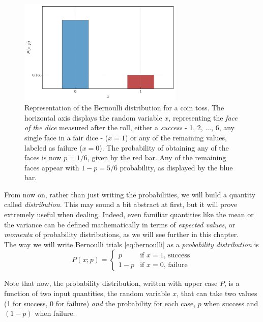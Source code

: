 \documentclass{book}
\begin{document}
\begin{figure}[ht]
    \centering
    \includegraphics[width=0.7\textwidth]{figures/chapter2/bernoulli_2.png}
    \caption{Representation of the Bernoulli distribution for a coin toss. The horizontal axis displays the random variable $x$, representing the \textit{face of the dice} measured after the roll, either a \textit{success} - 1, 2, ..., 6, any single face in a fair dice - ($x = 1$) or any of the remaining values, labeled as failure ($x = 0$). The probability of obtaining any of the faces is now $p = 1/6$, given by the red bar. Any of the remaining faces appear with $1 - p = 5/6$ probability, as displayed by the blue bar.}
    \label{fig:bernoulli_2}
\end{figure}

From now on, rather than just writing the probabilities, we will build a quantity called \textit{distribution}. This may sound a bit abstract at first, but it will prove extremely useful when dealing. Indeed, even familiar quantities like the mean or the variance can be defined mathematically in terms of \textit{expected values}, or \textit{momenta} of probability distributions, as we will see further in this chapter.\\

The way we will write Bernoulli trials \eqref{eq:bernoulli} as a \textit{probability distribution} is 
\begin{equation}
	P(x; p) = 
		\begin{cases}
			p & \text{if $x = 1$, success} \\
			1 - p & \text{if $x = 0$, failure}
		\end{cases}
\end{equation}

Note that now, the probability distribution, written with upper case $P$, is a function of two input quantities, the random variable $x$, that can take two values (1 for success, 0 for failure) \textit{and} the probability for each case, $p$ when success and $(1 - p)$ when failure.
\end{document}
